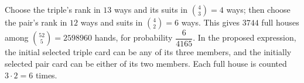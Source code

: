 Choose the triple's rank in $13$ ways and its suits in $\binom43=4$ ways; then choose the pair's rank in $12$ ways and suits in $\binom42=6$ ways. This gives $3744$ full houses among $\binom{52}{5}=2598960$ hands, for probability $\boxed{\dfrac{6}{4165}}$. In the proposed expression, the initial selected triple card can be any of its three members, and the initially selected pair card can be either of its two members. Each full house is counted $3\cdot2=6$ times.
